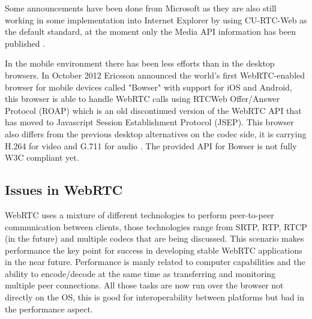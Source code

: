 Some announcements have been done from Microsoft as they are also still working in some implementation into Internet Explorer by using CU-RTC-Web as the default standard, at the moment only the Media API information has been published \cite{microsoftcapture}.

In the mobile environment there has been less efforts than in the desktop browsers. In October 2012 Ericsson announced the world's first WebRTC-enabled browser for mobile devices called "Bowser" with support for iOS and Android, this browser is able to handle WebRTC calls using RTCWeb Offer/Answer Protocol (ROAP) which is an old discontinued version of the WebRTC API that has moved to Javascript Session Establishment Protocol (JSEP). This browser also differs from the previous desktop alternatives on the codec side, it is carrying H.264 for video and G.711 for audio \cite{ericssonbowser}. The provided API for Bowser is not fully W3C compliant yet.

\subsection{Issues in WebRTC}

WebRTC uses a mixture of different technologies to perform peer-to-peer communication between clients, those technologies range from SRTP, RTP, RTCP (in the future) and multiple codecs that are being discussed. This scenario makes performance the key point for success in developing stable WebRTC applications in the near future. 
Performance is manly related to computer capabilities and the ability to encode/decode at the same time as transferring and monitoring multiple peer connections. All those tasks are now run over the browser not directly on the OS, this is good for interoperability between platforms but bad in the performance aspect. 


